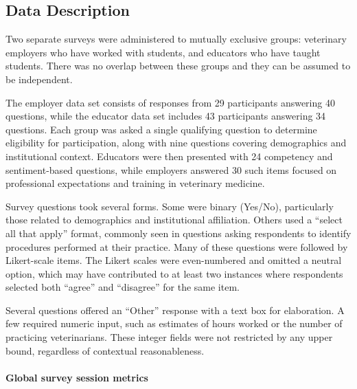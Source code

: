 \documentclass[
  11pt,
  letterpaper,
  DIV=11,
  numbers=noendperiod]{scrartcl}
\let\oldparagraph\paragraph
\renewcommand{\paragraph}[1]{\oldparagraph{#1}\mbox{}}
\numberwithin{figure}{section}
\begin{document}
\hypertarget{data-description}{%
\subsection{Data Description}\label{data-description}}

Two separate surveys were administered to mutually exclusive groups:
veterinary employers who have worked with students, and educators who
have taught students. There was no overlap between these groups and they
can be assumed to be independent.

The employer data set consists of responses from 29 participants
answering 40 questions, while the educator data set includes 43
participants answering 34 questions. Each group was asked a single
qualifying question to determine eligibility for participation, along
with nine questions covering demographics and institutional context.
Educators were then presented with 24 competency and sentiment-based
questions, while employers answered 30 such items focused on
professional expectations and training in veterinary medicine.

Survey questions took several forms. Some were binary (Yes/No),
particularly those related to demographics and institutional
affiliation. Others used a ``select all that apply'' format, commonly
seen in questions asking respondents to identify procedures performed at
their practice. Many of these questions were followed by Likert-scale
items. The Likert scales were even-numbered and omitted a neutral
option, which may have contributed to at least two instances where
respondents selected both ``agree'' and ``disagree'' for the same item.

Several questions offered an ``Other'' response with a text box for
elaboration. A few required numeric input, such as estimates of hours
worked or the number of practicing veterinarians. These integer fields
were not restricted by any upper bound, regardless of contextual
reasonableness.

\hypertarget{global-survey-session-metrics}{%
\paragraph{Global survey session
metrics}\label{global-survey-session-metrics}}
\end{document}
